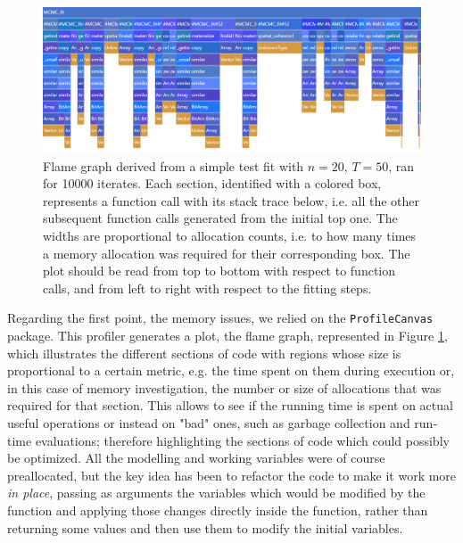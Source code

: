 \documentclass[12pt,	%
	a4paper,		%
	twoside,		%
	openright,		%
	titlepage,%
	]{book}
\theoremstyle{definition}
\newcommand{\mjline}[1]{\texttt{#1}}
\begin{document}
\begin{figure}[!ht]
    \centering
    \includegraphics[width=1\linewidth]{Testing//Scaling possibilities/flame graph actual model allocs count.png}
    \caption[Flame graph of a test fit]{Flame graph derived from a simple test fit with $n=20$, $T=50$, ran for 10000 iterates. Each section, identified with a colored box, represents a function call with its stack trace below, i.e. all the other subsequent function calls generated from the initial top one. The widths are proportional to allocation counts, i.e. to how many times a memory allocation was required for their corresponding box. The plot should be read from top to bottom with respect to function calls, and from left to right with respect to the fitting steps.}
    \label{fig: flame graph}
\end{figure}

Regarding the first point, the memory issues, we relied on the \mjline{ProfileCanvas} package. This profiler generates a plot, the flame graph, represented in Figure \ref{fig: flame graph}, which illustrates the different sections of code with regions whose size is proportional to a certain metric, e.g. the time spent on them during execution or, in this case of memory investigation, the number or size of allocations that was required for that section. This allows to see if the running time is spent on actual useful operations or instead on "bad" ones, such as garbage collection and run-time evaluations; therefore highlighting the sections of code which could possibly be optimized. All the modelling and working variables were of course preallocated, but the key idea has been to refactor the code to make it work more \textit{in place}, passing as arguments the variables which would be modified by the function and applying those changes directly inside the function, rather than returning some values and then use them to modify the initial variables.
\end{document}
